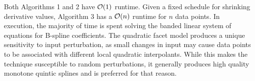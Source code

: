 
Both Algorithms 1 and 2 have ${\cal O}(1)$ runtime. Given a fixed
schedule for shrinking derivative values, Algorithm 3 has a ${\cal
  O}(n)$ runtime for $n$ data points. In execution, the majority of
time is spent solving the banded linear system of equations for
B-spline coefficients. The quadratic facet model produces a unique
sensitivity to input perturbation, as small changes in input may cause
data points to be associated with different local quadratic
interpolants. While this makes the technique susceptible to random
perturbations, it generally produces high quality monotone quintic
splines and is preferred for that reason.
